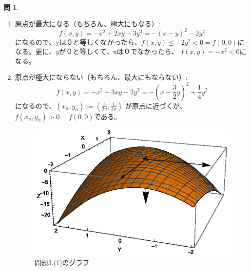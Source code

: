 \documentclass[12pt]{article} %
\theoremstyle{definition}
\newtheorem{question}{問}
\begin{document}
\begin{question}
	\begin{enumerate}[(1)]
		\item 原点が最大になる（もちろん、極大にもなる）:\begin{equation*}
				f(x,y)=-x^2+2xy-3y^2=-(x-y)^2-2y^2
			\end{equation*}
			になるので、yは０と等しくなかったら、$f(x,y)\le-2y^2<0=f(0,0)$になる。更に、$y$が０と等しくて、xは０でなかったら、
			$f(x,y)=-x^2<0$になる。
		\item 原点が極大にならない（もちろん、最大にもならない）:\begin{equation*}
				f(x,y)=-x^2+3xy-2y^2=-\left( x-\frac{3}{2}y \right)^2+\frac{1}{4}y^2
			\end{equation*}
			になるので、$(x_n,y_n):=\left( \frac{3}{2n},\frac{1}{2n} \right)$ が原点に近づくが、$f(x_n,y_n)>0=f(0,0)$である。
			\begin{figure}[h!]
				\centering
				\includegraphics{3d1}
				\caption{問題3.(1)のグラフ}
			\end{figure}
	\end{enumerate}
\end{question}
\end{document}
